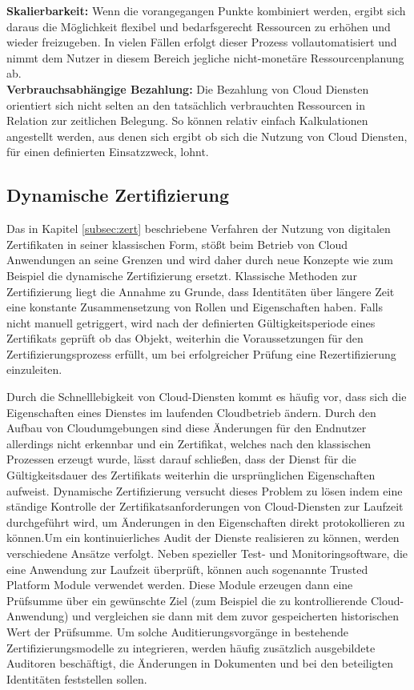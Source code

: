 \documentclass[
book,
a4paper,   
titlepage,  
halfparskip,
12pt        
]{scrartcl}
\begin{document}
\begin{onehalfspacing}
\textbf{Skalierbarkeit:} Wenn die vorangegangen Punkte kombiniert werden, ergibt sich daraus die Möglichkeit flexibel und bedarfsgerecht Ressourcen zu erhöhen und wieder freizugeben. In vielen Fällen erfolgt dieser Prozess vollautomatisiert und nimmt dem Nutzer in diesem Bereich jegliche nicht-monetäre Ressourcenplanung ab.\cite[S. 9]{cloudsec}\\
\textbf{Verbrauchsabhängige Bezahlung:} Die Bezahlung von Cloud Diensten orientiert sich nicht selten an den tatsächlich verbrauchten Ressourcen in Relation zur zeitlichen Belegung. So können relativ einfach Kalkulationen angestellt werden, aus denen sich ergibt ob sich die Nutzung von Cloud Diensten, für einen definierten Einsatzzweck, lohnt.\cite[S. 9]{cloudsec}\\

\subsection{Dynamische Zertifizierung} 
Das in Kapitel \vref{subsec:zert} beschriebene Verfahren der Nutzung von digitalen Zertifikaten in seiner klassischen Form, stößt beim Betrieb von Cloud Anwendungen an seine Grenzen und wird daher durch neue Konzepte wie zum Beispiel die dynamische Zertifizierung ersetzt. Klassische Methoden zur Zertifizierung liegt die Annahme zu Grunde, dass Identitäten über längere Zeit eine konstante Zusammensetzung von Rollen und Eigenschaften haben. Falls nicht manuell getriggert, wird nach der definierten Gültigkeitsperiode eines Zertifikats geprüft ob das Objekt, weiterhin die Voraussetzungen für den Zertifizierungsprozess erfüllt, um bei erfolgreicher Prüfung eine Rezertifizierung einzuleiten.\cite{cloudabs}

Durch die Schnelllebigkeit von Cloud-Diensten kommt es häufig vor, dass sich die Eigenschaften eines Dienstes im laufenden Cloudbetrieb ändern. Durch den Aufbau von Cloudumgebungen sind diese Änderungen für den Endnutzer allerdings nicht erkennbar und ein Zertifikat, welches nach den klassischen Prozessen erzeugt wurde, lässt darauf schließen, dass der Dienst für die Gültigkeitsdauer des Zertifikats weiterhin die ursprünglichen Eigenschaften aufweist. Dynamische Zertifizierung versucht dieses Problem zu lösen indem eine ständige Kontrolle der Zertifikatsanforderungen von Cloud-Diensten zur Laufzeit durchgeführt wird, um Änderungen in den Eigenschaften direkt protokollieren zu können.\newline Um ein kontinuierliches Audit der Dienste realisieren zu können, werden verschiedene Ansätze verfolgt. Neben spezieller Test- und Monitoringsoftware, die eine Anwendung zur Laufzeit überprüft, können auch sogenannte Trusted Platform Module verwendet werden. Diese Module erzeugen dann eine Prüfsumme über ein gewünschte Ziel (zum Beispiel die zu kontrollierende Cloud-Anwendung) und vergleichen sie dann mit dem zuvor gespeicherten historischen Wert der Prüfsumme. Um solche Auditierungsvorgänge in bestehende Zertifizierungsmodelle zu integrieren, werden häufig zusätzlich ausgebildete Auditoren beschäftigt, die Änderungen in Dokumenten und bei den beteiligten Identitäten feststellen sollen.\cite[S. 114ff]{cloudsec}


\end{onehalfspacing}
\end{document}

